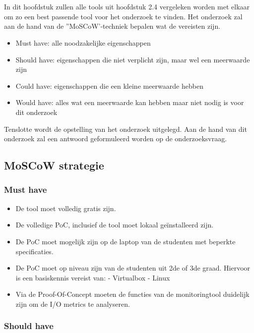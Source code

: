 \chapter{}
\label{ch:methodologie}

In dit hoofdstuk zullen alle tools uit hoofdstuk 2.4 vergeleken worden met elkaar om zo een best passende tool voor het onderzoek te vinden. Het onderzoek zal aan de hand van de ''MoSCoW'-techniek bepalen wat de vereisten zijn.
 
\begin{itemize}
    \item Must have: alle noodzakelijke eigenschappen
    \item Should have: eigenschappen die niet verplicht zijn, maar wel een meerwaarde zijn
    \item Could have: eigenschappen die een kleine meerwaarde hebben
    \item Would have: alles wat een meerwaarde kan hebben maar niet nodig is voor dit onderzoek
\end{itemize}

Tenslotte wordt de opstelling van het onderzoek uitgelegd. Aan de hand van dit onderzoek zal een antwoord geformuleerd worden op de onderzoeksvraag.\clearpage
\section{MoSCoW strategie}
\subsection{Must have}
\begin{itemize}
    \item De tool moet volledig gratis zijn.
    \item De volledige PoC, inclusief de tool moet lokaal geïnstalleerd zijn.
    \item De PoC moet mogelijk zijn op de laptop van de studenten met beperkte specificaties.
    \item De PoC moet op niveau zijn van de studenten uit 2de of 3de graad. Hiervoor is een basiskennis vereist van:
        \subitem - Virtualbox
        \subitem - Linux
    \item Via de Proof-Of-Concept moeten de functies van de monitoringtool duidelijk zijn om de I/O metrics te analyseren.
\end{itemize}

\subsection{Should have}

